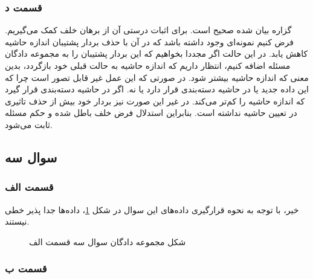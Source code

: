 \documentclass{article}
\begin{document}
\subsubsection*{قسمت د}

گزاره بیان شده صحیح است. برای اثبات درستی آن از برهان خلف کمک می‌گیریم. فرض کنیم نمونه‌ای وجود داشته باشد که در آن
با حذف بردار پشتیبان اندازه حاشیه کاهش یابد. در این حالت اگر مجددا بخواهیم که این بردار پشتیبان را به مجموعه دادگان
مسئله اضافه کنیم، انتظار داریم که اندازه حاشیه به حالت قبلی خود بازگردد، بدین معنی که اندازه حاشیه بیشتر شود.
در صورتی که این عمل غیر قابل تصور است چرا که این داده جدید یا در حاشیه دسته‌بندی قرار دارد یا نه. اگر در حاشیه دسته‌بندی
قرار گیرد که اندازه حاشیه را کم‌تر می‌کند. در غیر این صورت نیز بردار خود بیش از حذف تاثیری در تعیین حاشیه نداشته است.
بنابراین استدلال فرض خلف باطل شده و حکم مسئله ثابت می‌شود.

\subsection*{سوال سه}

\subsubsection*{قسمت الف}

خیر، با توجه به نحوه قرارگیری داده‌های این سوال در شکل \ref{question3-parta}، داده‌ها جدا پذیر خطی نیستند.

\begin{figure}[h]
    \centering
    \caption{شکل مجموعه دادگان سوال سه قسمت الف}
    \label{question3-parta}
\end{figure}

\subsubsection*{قسمت ب}
\end{document}
